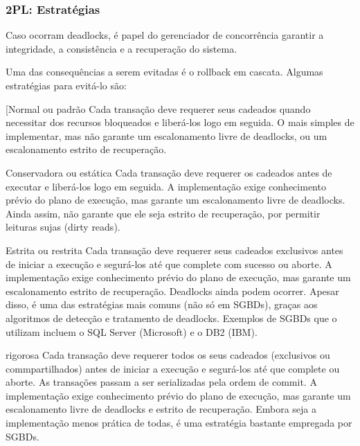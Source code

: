\documentclass{beamer}
\begin{document}
\begin{frame}
    \frametitle{2PL: Estratégias}
    
    Caso ocorram deadlocks, é papel do gerenciador de concorrência garantir a integridade, a consistência e a recuperação do sistema.
    
    Uma das consequências a serem evitadas é o rollback em cascata. Algumas estratégias para evitá-lo são:
    
        \begin{block}[{Normal ou padrão}
            Cada transação deve requerer seus cadeados quando necessitar dos recursos bloqueados e liberá-los logo em seguida. O mais simples de implementar, mas não garante um escalonamento livre de deadlocks, ou um escalonamento estrito de recuperação.
        \end{block}
        \begin{block}{Conservadora ou estática}
            Cada transação deve requerer os cadeados antes de executar e liberá-los logo em seguida. A implementação exige conhecimento prévio do plano de execução, mas garante um escalonamento livre de deadlocks. Ainda assim, não garante que ele seja estrito de recuperação, por permitir leituras sujas (dirty reads).
        \end{block}
        
\end{frame}


\begin{frame}
    \begin{block}{Estrita ou restrita}
        Cada transação deve requerer seus cadeados exclusivos antes de iniciar a execução e segurá-los até que complete com sucesso ou aborte. A implementação exige conhecimento prévio do plano de execução, mas garante um escalonamento estrito de recuperação. Deadlocks ainda podem ocorrer. Apesar disso, é uma das estratégias mais comuns (não só em SGBDs), graças aos algoritmos de detecção e tratamento de deadlocks. Exemplos de SGBDs que o utilizam incluem o SQL Server (Microsoft) e o DB2 (IBM).
    \end{block}
    \begin{block}{rigorosa}
        Cada transação deve requerer todos os seus cadeados (exclusivos ou commpartilhados) antes de iniciar a execução e segurá-los até que complete ou aborte. As transações passam a ser serializadas pela ordem de commit. A implementação exige conhecimento prévio do plano de execução, mas garante um escalonamento livre de deadlocks e estrito de recuperação. Embora seja a implementação menos prática de todas, é uma estratégia bastante empregada por SGBDs.
    \end{block}
\end{frame}
\end{document}
